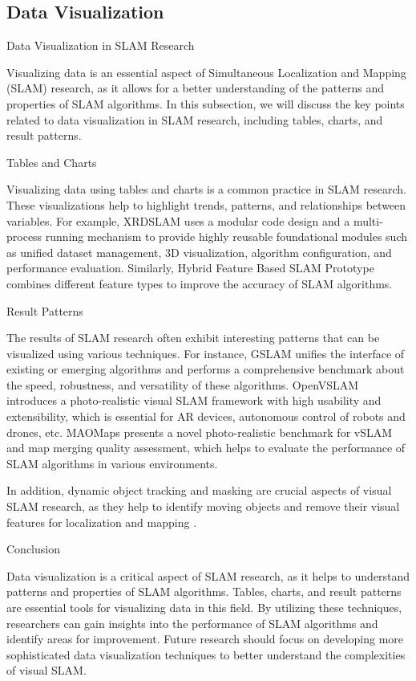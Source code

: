 \documentclass[conference]{IEEEtran}
\begin{document}
\subsection{Data Visualization}
Data Visualization in SLAM Research

Visualizing data is an essential aspect of Simultaneous Localization and Mapping (SLAM) research, as it allows for a better understanding of the patterns and properties of SLAM algorithms. In this subsection, we will discuss the key points related to data visualization in SLAM research, including tables, charts, and result patterns.

Tables and Charts

Visualizing data using tables and charts is a common practice in SLAM research. These visualizations help to highlight trends, patterns, and relationships between variables. For example, XRDSLAM \cite{xrdslem} uses a modular code design and a multi-process running mechanism to provide highly reusable foundational modules such as unified dataset management, 3D visualization, algorithm configuration, and performance evaluation. Similarly, Hybrid Feature Based SLAM Prototype \cite{hybridfeature} combines different feature types to improve the accuracy of SLAM algorithms.

Result Patterns

The results of SLAM research often exhibit interesting patterns that can be visualized using various techniques. For instance, GSLAM \cite{gslam} unifies the interface of existing or emerging algorithms and performs a comprehensive benchmark about the speed, robustness, and versatility of these algorithms. OpenVSLAM \cite{openvslem} introduces a photo-realistic visual SLAM framework with high usability and extensibility, which is essential for AR devices, autonomous control of robots and drones, etc. MAOMaps \cite{mao Maps} presents a novel photo-realistic benchmark for vSLAM and map merging quality assessment, which helps to evaluate the performance of SLAM algorithms in various environments.

In addition, dynamic object tracking and masking are crucial aspects of visual SLAM research, as they help to identify moving objects and remove their visual features for localization and mapping \cite{dynamicobject}.

Conclusion

Data visualization is a critical aspect of SLAM research, as it helps to understand patterns and properties of SLAM algorithms. Tables, charts, and result patterns are essential tools for visualizing data in this field. By utilizing these techniques, researchers can gain insights into the performance of SLAM algorithms and identify areas for improvement. Future research should focus on developing more sophisticated data visualization techniques to better understand the complexities of visual SLAM.
\end{document}
